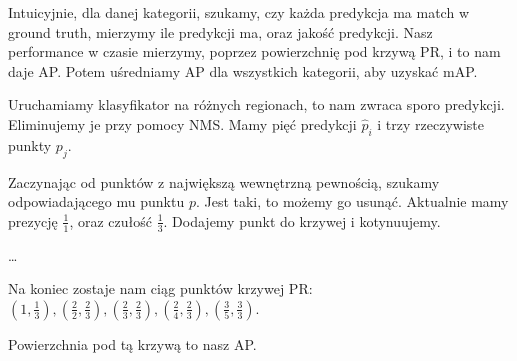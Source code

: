 \documentclass{../notatki}
\begin{document}
Intuicyjnie, dla danej kategorii, szukamy, czy każda predykcja ma match
w ground truth, mierzymy ile predykcji ma, oraz jakość predykcji. Nasz
performance w czasie mierzymy, poprzez powierzchnię pod krzywą PR, i
to nam daje AP. Potem uśredniamy AP dla
wszystkich kategorii, aby uzyskać mAP.

\begin{examplebox}

  Uruchamiamy klasyfikator na różnych regionach, to nam zwraca sporo predykcji.
  Eliminujemy je przy pomocy NMS.
  Mamy pięć predykcji $\hat{p}_i$ i trzy rzeczywiste punkty $p_j$.

  Zaczynając od punktów z największą wewnętrzną pewnością, szukamy
  odpowiadającego mu punktu $p$. Jest taki, to możemy go usunąć. Aktualnie mamy
  prezycję $\frac{1}{1}$, oraz czułość $\frac{1}{3}$. Dodajemy punkt do krzywej
  i kotynuujemy.

  \dots

  Na koniec zostaje nam ciąg punktów krzywej PR: $\left(1,
  \frac{1}{3}\right), \left(\frac{2}{2}, \frac{2}{3}\right),
  \left(\frac{2}{3}, \frac{2}{3}\right), \left(\frac{2}{4},
  \frac{2}{3}\right), \left(\frac{3}{5}, \frac{3}{3}\right)$.

  \begin{center}
  \end{center}
  Powierzchnia pod tą krzywą to nasz AP.

\end{examplebox}
\end{document}
